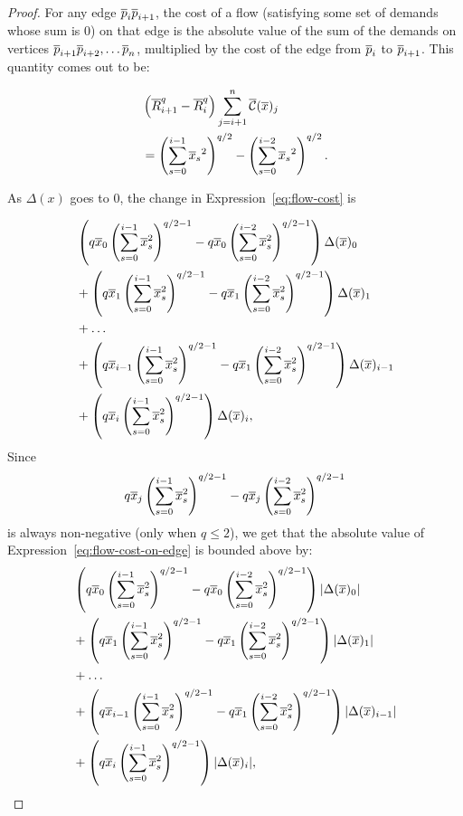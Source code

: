 \begin{proof} For any edge $\overline{p}_i\overline{p}_{i+1}$, the cost of a flow (satisfying
some set of demands whose sum is $0$) on that edge is the absolute value of
the sum of the demands on vertices $\overline{p}_{i+1} \overline{p}_{i+2}, \ldots \overline{p}_n$,
multiplied by the cost of the edge from $\overline{p}_i$ to $\overline{p}_{i+1}$. This
quantity comes out to be:

\begin{align} &\left(\overline{R}_{i+1}^q-\overline{R}_{i}^q \right) \sum_{j=i+1}^n \overline{\mathcal{C}}(\overline{x})_j
\\
\label{eq:flow-cost}
&=\left(\sum_{s=0}^{i-1} {\overline{x}_s}^2\right)^{q/2} -\left(\sum_{s=0}^{i-2}
{\overline{x}_s}^2\right)^{q/2}.
\end{align}

As $\Delta(x)$ goes to $0$, the change in Expression~\ref{eq:flow-cost} is

\begin{align}
\begin{split}
\label{eq:flow-cost-on-edge}
&
\left(q\overline{x}_0 \left(\sum_{s=0}^{i-1} \overline{x}_s^2 \right)^{q/2-1} -
q\overline{x}_0\left(\sum_{s=0}^{i-2} \overline{x}_s^2 \right)^{q/2-1} \right) \Delta(\overline{x})_0
\\
&+
\left(q\overline{x}_1 \left(\sum_{s=0}^{i-1} \overline{x}_s^2 \right)^{q/2-1} -
q\overline{x}_1\left(\sum_{s=0}^{i-2}\overline{x}_s^2 \right)^{q/2-1} \right) \Delta(\overline{x})_1
\\
&+ \ldots
\\
&+
\left(q\overline{x}_{i-1} \left(\sum_{s=0}^{i-1} \overline{x}_s^2 \right)^{q/2-1} -
q\overline{x}_1\left(\sum_{s=0}^{i-2}\overline{x}_s^2 \right)^{q/2-1}
\right)\Delta(\overline{x})_{i-1}
\\
&+
\left(q\overline{x}_i \left(\sum_{s=0}^{i-1} \overline{x}_s^2
\right)^{q/2-1}\right)\Delta(\overline{x})_i,
\end{split}
\end{align}
Since 
\[
q\overline{x}_j\left(\sum_{s=0}^{i-1} \overline{x}_s^2\right)^{q/2-1} - q\overline{x}_j\left(\sum_{s=0}^{i-2}
\overline{x}_s^2 \right)^{q/2-1}\]
is always non-negative (only when $q \leq 2$), we get that the absolute value of
Expression~\ref{eq:flow-cost-on-edge} is bounded above by:
\begin{align}
\begin{split}
\label{eq:flow-cost-upper-bound}
&
\left(q\overline{x}_0 \left(\sum_{s=0}^{i-1} \overline{x}_s^2 \right)^{q/2-1} -
q\overline{x}_0\left(\sum_{s=0}^{i-2} \overline{x}_s^2 \right)^{q/2-1} \right)
|\Delta(\overline{x})_0|
\\
&+
\left(q\overline{x}_1 \left(\sum_{s=0}^{i-1} \overline{x}_s^2 \right)^{q/2-1} -
q\overline{x}_1\left(\sum_{s=0}^{i-2}\overline{x}_s^2 \right)^{q/2-1} \right) |\Delta(\overline{x})_1|
\\
&+ \ldots
\\
&+
\left(q\overline{x}_{i-1} \left(\sum_{s=0}^{i-1} \overline{x}_s^2 \right)^{q/2-1} -
q\overline{x}_1\left(\sum_{s=0}^{i-2}\overline{x}_s^2 \right)^{q/2-1}
\right)|\Delta(\overline{x})_{i-1}|
\\
&+
\left(q\overline{x}_i \left(\sum_{s=0}^{i-1} \overline{x}_s^2
\right)^{q/2-1}\right)|\Delta(\overline{x})_i|,
\end{split}
\end{align}


\end{proof}

